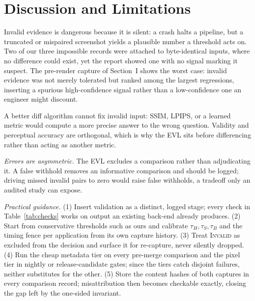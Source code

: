 \documentclass[conference]{IEEEtran}
\begin{document}
\section{Discussion and Limitations}\label{sec:disc}
Invalid evidence is dangerous because it is silent: a crash halts a pipeline, but a truncated or mispaired screenshot yields a plausible number a threshold acts on. Two of our three impossible records were attached to byte-identical inputs, where no difference could exist, yet the report showed one with no signal marking it suspect. The pre-render capture of Section~I shows the worst case: invalid evidence was not merely tolerated but ranked among the largest regressions, inserting a spurious high-confidence signal rather than a low-confidence one an engineer might discount.

A better diff algorithm cannot fix invalid input: SSIM, LPIPS, or a learned metric would compute a more precise answer to the wrong question. Validity and perceptual accuracy are orthogonal, which is why the EVL sits before differencing rather than acting as another metric.

\textit{Errors are asymmetric.} The EVL excludes a comparison rather than adjudicating it. A false withhold removes an informative comparison and should be logged; driving missed invalid pairs to zero would raise false withholds, a tradeoff only an audited study can expose.

\textit{Practical guidance.} (1) Insert validation as a distinct, logged stage; every check in Table~\ref{tab:checks} works on output an existing back-end already produces. (2) Start from conservative thresholds such as ours and calibrate $\tau_H,\tau_S,\tau_B$ and the timing fence per application from its own capture history. (3) Treat \textsc{Invalid} as excluded from the decision and surface it for re-capture, never silently dropped. (4) Run the cheap metadata tier on every pre-merge comparison and the pixel tier in nightly or release-candidate gates; since the tiers catch disjoint failures, neither substitutes for the other. (5) Store the content hashes of both captures in every comparison record; misattribution then becomes checkable exactly, closing the gap left by the one-sided invariant.
\end{document}
